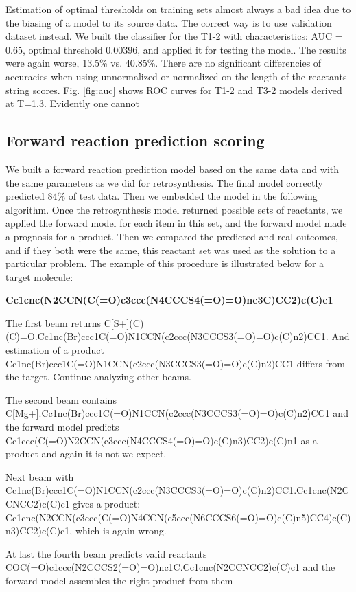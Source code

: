 \documentclass{article}
\begin{document}
 
Estimation of optimal thresholds on training sets almost always a bad idea due to the biasing of a model to its source data. The correct way is to use validation dataset instead. We built the classifier for the T1-2 with characteristics: AUC = 0.65, optimal threshold 0.00396, and applied it for testing the model. The results were again worse, 13.5\% vs. 40.85\%. There are no significant differencies of accuracies when using unnormalized or normalized on the length of the reactants string scores. Fig. \ref{fig:auc} shows ROC curves for T1-2 and T3-2 models derived at T=1.3. Evidently one cannot 

\subsection{Forward reaction prediction scoring}

We built a forward reaction prediction model based on the same data and with the same parameters as we did for retrosynthesis. The final model correctly predicted 84\% of test data. Then we embedded the model in the following algorithm. Once the retrosynthesis model returned possible sets of reactants, we applied the forward model for each item in this set, and the forward model made a prognosis for a product. Then we compared the predicted and real outcomes, and if they both were the same, this reactant set was used as the solution to a particular problem. The example of this procedure is illustrated below for a target molecule: 


\noindent\textbf{Cc1cnc(N2CCN(C(=O)c3ccc(N4CCCS4(=O)=O)nc3C)CC2)c(C)c1}

The first beam returns  C[S+](C)(C)=O.Cc1nc(Br)ccc1C(=O)N1CCN(c2ccc(N3CCCS3(=O)=O)c(C)n2)CC1.
And estimation of a product Cc1nc(Br)ccc1C(=O)N1CCN(c2ccc(N3CCCS3(=O)=O)c(C)n2)CC1 differs from the target. Continue analyzing other beams.

The second beam contains C[Mg+].Cc1nc(Br)ccc1C(=O)N1CCN(c2ccc(N3CCCS3(=O)=O)c(C)n2)CC1 and the forward model predicts   Cc1ccc(C(=O)N2CCN(c3ccc(N4CCCS4(=O)=O)c(C)n3)CC2)c(C)n1 as a product and again it is not we expect.

Next beam with Cc1nc(Br)ccc1C(=O)N1CCN(c2ccc(N3CCCS3(=O)=O)c(C)n2)CC1.Cc1cnc(N2CCNCC2)c(C)c1  gives a product: Cc1cnc(N2CCN(c3ccc(C(=O)N4CCN(c5ccc(N6CCCS6(=O)=O)c(C)n5)CC4)c(C)n3)CC2)c(C)c1, which is again wrong.

At last the fourth beam predicts valid reactants COC(=O)c1ccc(N2CCCS2(=O)=O)nc1C.Cc1cnc(N2CCNCC2)c(C)c1 and the forward model  assembles the right product from them 
\end{document}
